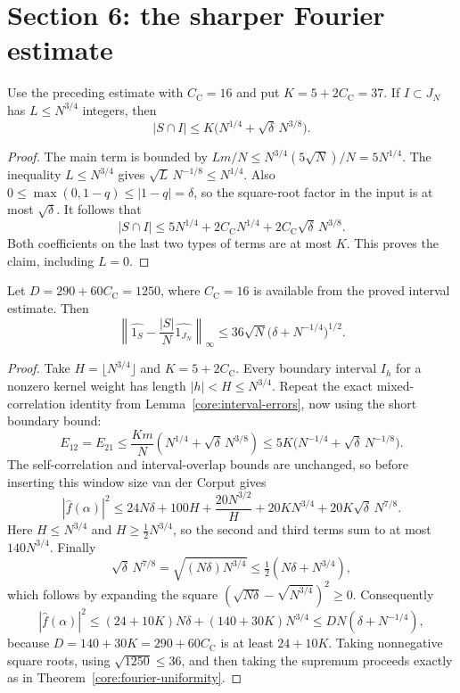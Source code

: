 \section{Section 6: the sharper Fourier estimate}

\begin{corollary}
\leanok
\label{core:cilleruelo-short-boundary}
Use the preceding estimate with $C_{\mathrm C}=16$ and put
$K=5+2C_{\mathrm C}=37$.  If $I\subset J_N$ has $L\leq N^{3/4}$
integers, then
\[
 |S\cap I|\leq K\bigl(N^{1/4}+\sqrt\delta\,N^{3/8}\bigr).
\]
\end{corollary}
\begin{proof}
The main term is bounded by
$Lm/N\leq N^{3/4}(5\sqrt N)/N=5N^{1/4}$.
The inequality $L\leq N^{3/4}$ gives
$\sqrt L\,N^{-1/8}\leq N^{1/4}$.
Also $0\leq\max(0,1-q)\leq|1-q|=\delta$, so the square-root
factor in the input is at most $\sqrt\delta$.
It follows that
\[
 |S\cap I|\leq5N^{1/4}
       +2C_{\mathrm C}N^{1/4}
       +2C_{\mathrm C}\sqrt\delta\,N^{3/8}.
\]
Both coefficients on the last two types of terms are at most $K$.
This proves the claim, including $L=0$.
\end{proof}

\begin{theorem}
\leanok
\label{core:improved-fourier-uniformity}
Let $D=290+60C_{\mathrm C}=1250$, where $C_{\mathrm C}=16$ is available
from the proved interval estimate.  Then
\[
 \left\|\widehat{1_S}-\frac{|S|}{N}\widehat{1_{J_N}}\right\|_\infty
 \leq36\sqrt N\bigl(\delta+N^{-1/4}\bigr)^{1/2}.
\]
\end{theorem}
\begin{proof}
Take $H=\lfloor N^{3/4}\rfloor$ and $K=5+2C_{\mathrm C}$.
Every boundary interval $I_h$ for a nonzero kernel weight has
length $|h|<H\leq N^{3/4}$.  Repeat the exact mixed-correlation
identity from Lemma~\ref{core:interval-errors}, now using the short
boundary bound:
\[
 E_{12}=E_{21}
 \leq\frac{Km}{N}(N^{1/4}+\sqrt\delta\,N^{3/8})
 \leq5K\bigl(N^{-1/4}+\sqrt\delta\,N^{-1/8}\bigr).
\]
The self-correlation and interval-overlap bounds are unchanged,
so before inserting this window size van der Corput gives
\[
 |\widehat f(\alpha)|^2
 \leq24N\delta+100H+\frac{20N^{3/2}}H
             +20KN^{3/4}+20K\sqrt\delta\,N^{7/8}.
\]
Here $H\leq N^{3/4}$ and $H\geq\frac12N^{3/4}$, so the second
and third terms sum to at most $140N^{3/4}$.  Finally
\[
 \sqrt\delta\,N^{7/8}
   =\sqrt{(N\delta)N^{3/4}}
   \leq\tfrac12(N\delta+N^{3/4}),
\]
which follows by expanding the square
$(\sqrt{N\delta}-\sqrt{N^{3/4}})^2\geq0$.
Consequently
\[
 |\widehat f(\alpha)|^2
 \leq(24+10K)N\delta+(140+30K)N^{3/4}
 \leq D N(\delta+N^{-1/4}),
\]
because $D=140+30K=290+60C_{\mathrm C}$ is at least $24+10K$.
Taking nonnegative square roots, using $\sqrt{1250}\leq36$, and
then taking the supremum proceeds exactly as in
Theorem~\ref{core:fourier-uniformity}.
\end{proof}

